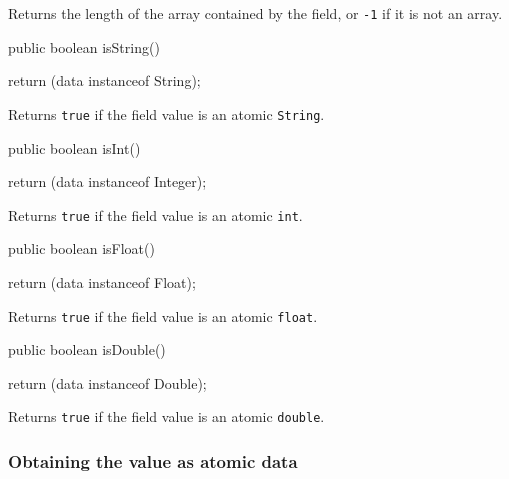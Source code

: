 \begin{tabb}
Returns the length of the array contained by the field, or \texttt{-1}
  if it is not an array.
\end{tabb}
\begin{code}

   public boolean isString() \begin{hide} {
      return (data instanceof String);
   }
   \end{hide}
\end{code}
\begin{tabb}
Returns \texttt{true} if the field value is an atomic \texttt{String}.
\end{tabb}
\begin{code}

   public boolean isInt() \begin{hide} {
      return (data instanceof Integer);
   }
   \end{hide}
\end{code}
\begin{tabb}
Returns \texttt{true} if the field value is an atomic \texttt{int}.
\end{tabb}
\begin{code}
   
   public boolean isFloat() \begin{hide} {
      return (data instanceof Float);
   }
   \end{hide}
\end{code}
\begin{tabb}
Returns \texttt{true} if the field value is an atomic \texttt{float}.
\end{tabb}
\begin{code}

   public boolean isDouble() \begin{hide} {
      return (data instanceof Double);
   }
   \end{hide}
\end{code}
\begin{tabb}
Returns \texttt{true} if the field value is an atomic \texttt{double}.
\end{tabb}
      

\subsubsection*{Obtaining the value as atomic data}

